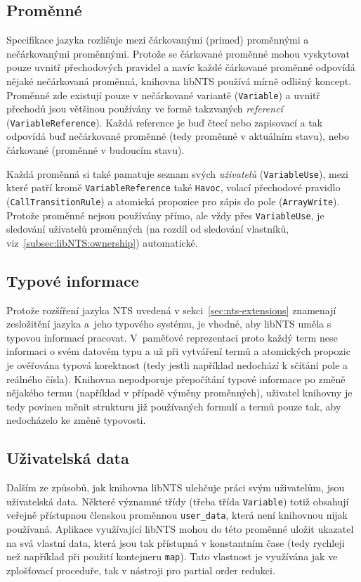 \documentclass[12pt]{fithesis2}
\begin{document}
\subsection{Proměnné}
Specifikace jazyka rozlišuje mezi čárkovanými (primed) proměnnými a nečárkovanými proměnnými. Protože se čárkované proměnné mohou vyskytovat pouze uvnitř přechodových pravidel a navíc každé čárkované proměnné odpovídá nějaké nečárkovaná proměnná, knihovna libNTS používá mírně odlišný koncept. Proměnné zde existují pouze v nečárkované variantě (\texttt{Variable}) a uvnitř přechodů jsou většinou používány ve formě takzvaných \textit{referencí} (\texttt{VariableReference}). Každá reference je buď čtecí nebo zapisovací a tak odpovídá buď nečárkované proměnné (tedy proměnné v aktuálním stavu), nebo čárkované (proměnné v budoucím stavu).

\label{subsec:libNTS:variable:use}
Každá proměnná si také pamatuje seznam svých \textit{uživatelů} (\texttt{VariableUse}), mezi které patří kromě \texttt{VariableReference} také \texttt{Havoc}, volací přechodové pravidlo (\texttt{CallTransitionRule}) a atomická propozice pro zápis do pole (\texttt{ArrayWrite}). Protože proměnné nejsou používány přímo, ale vždy přes \texttt{VariableUse}, je sledování uživatelů proměnných (na rozdíl od sledování vlastníků, viz~\ref{subsec:libNTS:ownership}) automatické.

\subsection{Typové informace}
Protože rozšíření jazyka NTS uvedená v sekci~\ref{sec:nts-extensions} znamenají zesložitění jazyka a~jeho typového systému, je vhodné, aby libNTS uměla s typovou informací pracovat. V~paměťové reprezentaci proto každý term nese informaci o svém datovém typu a už při vytváření termů a atomických propozic je ověřována typová korektnost (tedy jestli například nedochází k sčítání pole a reálného čísla). Knihovna nepodporuje přepočítání typové informace po změně nějakého termu (například v případě výměny proměnných), uživatel knihovny je tedy povinen měnit strukturu již používaných formulí a termů pouze tak, aby nedocházelo ke změně typovosti.

\subsection{Uživatelská data}
Dalším ze způsobů, jak knihovna libNTS ulehčuje práci svým uživatelům, jsou uživatelská data. Některé významné třídy (třeba třída \texttt{Variable}) totiž obsahují veřejně přístupnou členskou proměnnou \texttt{user\_data}, která není knihovnou nijak používaná. Aplikace využívající libNTS mohou do této proměnné  uložit ukazatel na svá vlastní data, která jsou tak přístupná v konstantním čase (tedy rychleji než například při použití kontejneru \texttt{map}). Tato vlastnost je využívána jak ve zplošťovací proceduře, tak v nástroji pro partial order redukci.
\end{document}
